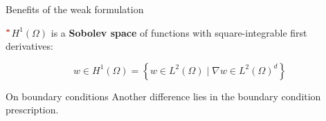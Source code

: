 \begin{frame}{Benefits of the weak formulation}
   

   \vspace{-0.5cm}


   \vspace{0.6cm}

   $^{\boldsymbol{\textcolor{BrickRed}{\ast}}}$\scriptsize{$H^1(\Omega)$ is a \textbf{Sobolev space} of functions with square-integrable first derivatives:}

   \begin{equation*}
      w\in H^1(\Omega)=\left\{w\in L^2(\Omega)\mid\nabla w\in L^2(\Omega)^d\right\}
   \end{equation*}

   \normalsize
\end{frame}

\begin{frame}{On boundary conditions}
   Another difference lies in the boundary condition prescription.

   \vspace{0.35cm}

   \pause

   

   \vspace{-0.5cm}

   \pause

   
\end{frame}


